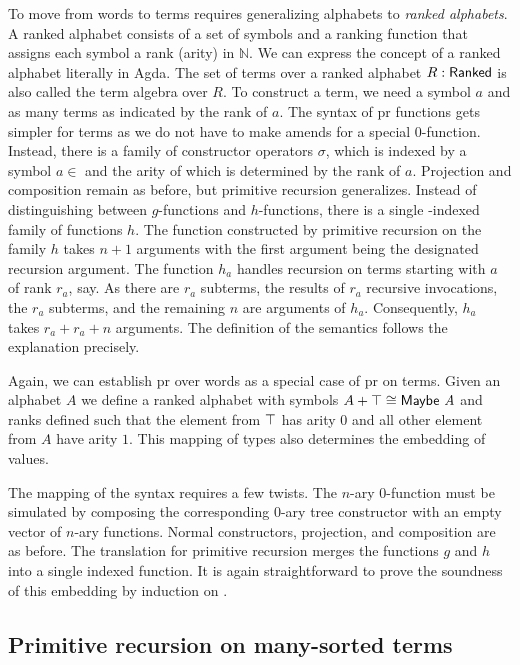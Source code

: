 \documentclass{jfp}
\newcommand\Nat{\ensuremath{\mathbb{N}}}
\begin{document}
To move from words to terms requires generalizing alphabets to
\emph{ranked alphabets}. A ranked alphabet consists of a set of
symbols and a ranking function that assigns each symbol a rank (arity) in \Nat.
We can express the concept of a ranked alphabet literally in Agda. 
\PRTreesRanked
The set of terms over a ranked alphabet $R : \ARanked$ is also called the term algebra over $R$.
To construct a term, we need a symbol $a$ and as many terms as indicated by the rank of $a$.
\PRTreesTerm
The syntax of pr functions gets simpler for terms as we do not have to make amends for a special $0$-function.
Instead, there is a family of constructor operators $σ$, which is indexed by a symbol $a∈$ and the arity of which is determined by the rank of $a$. Projection and composition remain as before, but primitive recursion generalizes.
Instead of distinguishing between $g$-functions and $h$-functions, there is a single -indexed family of functions $h$.
The function constructed by primitive recursion on the family $h$ takes $n+1$ arguments with the first argument being the designated recursion argument.
The function $h_a$ handles recursion on terms starting with $a$ of rank $r_a$, say.
As there are $r_a$ subterms, the results of $r_a$ recursive invocations, the $r_a$ subterms, and the remaining $n$ are arguments of $h_a$.
Consequently, $h_a$ takes $r_a + r_a + n$ arguments.
\PRTreesDefinition
The definition of the semantics follows the explanation precisely.

Again, we can establish pr over words as a special case of pr on
terms. Given an alphabet $A$ we define a ranked alphabet with symbols
$A + \ATop \cong \text{\AMaybe{A}}$ and ranks defined such that the element
from $\ATop$ has arity $0$ and all other element from $A$ have arity
$1$. This mapping of types also determines the embedding of values.

\PRWordsToTreesEncodingRanks
The mapping of the syntax requires a few twists.
The $n$-ary $0$-function must be simulated by composing the corresponding $0$-ary tree constructor with an empty vector of $n$-ary functions.
Normal constructors, projection, and composition are as before.
The translation for primitive recursion merges the functions $g$ and $h$ into a single indexed function.
\PRWordsToTreesEncoding
It is again straightforward to prove the soundness of this embedding
by induction on .
\PRWordsToTreesEncodingSound

\subsection{Primitive recursion on many-sorted terms}
\label{sec:prim-recurs-sort}
\end{document}
